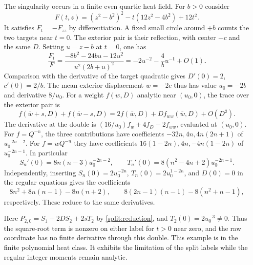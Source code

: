 The singularity occurs in a finite even quartic heat field.
For \(b>0\) consider
\begin{equation}
 F(t,z)=(z^2-b^2)^2-t(12z^2-4b^2)+12t^2 .
 \label{split:quartic}
\end{equation}
It satisfies \(F_t=-F_{zz}\) by differentiation. A fixed small
circle around \(+b\) counts the two targets near \(t=0\). The
exterior pair is their reflection, with center \(-c\) and the same
\(D\). Setting \(u=z-b\) at \(t=0\), one has
\[
 \frac{F_t}{F}
  =\frac{-8b^2-24bu-12u^2}{u^2(2b+u)^2}
  =-2u^{-2}-\frac4b u^{-1}+O(1).
\]
Comparison with the derivative of the target quadratic gives
\(D'(0)=2\), \(c'(0)=2/b\). The mean exterior displacement
\(\bar w=-2c\) thus has value \(u_0=-2b\) and derivative \(8/u_0\).
For a weight \(f(w,D)\) analytic near \((u_0,0)\), the trace over
the exterior pair is
\[
 f(\bar w+s,D)+f(\bar w-s,D)
    =2f(\bar w,D)+Df_{ww}(\bar w,D)+O(D^2).
\]
The derivative at the double is
\((16/u_0) f_w+4f_D+2f_{ww}\), evaluated at \((u_0,0)\).
For \(f=Q^{-n}\), the three contributions have coefficients
\(-32n,4n,4n(2n+1)\) of \(u_0^{-2n-2}\). For \(f=wQ^{-n}\)
they have coefficients \(16(1-2n),4n,-4n(1-2n)\) of
\(u_0^{-2n-1}\). In particular
\[
 S_n'(0)=8n(n-3)u_0^{-2n-2},\qquad
 T_n'(0)=8(n^2-4n+2)u_0^{-2n-1}.
\]
Independently, inserting \(S_n(0)=2u_0^{-2n}\),
\(T_n(0)=2u_0^{1-2n}\), and \(D(0)=0\) in the regular equations
gives the coefficients
\[
 8n^2+8n(n-1)-8n(n+2),
 \qquad
 8(2n-1)(n-1)-8(n^2+n-1),
\]
respectively. These reduce to the same derivatives.

Here \(P_{2,0}=S_1+2DS_2+2sT_2\) by \eqref{split:reduction},
and \(T_2(0)=2u_0^{-3}\ne0\). Thus the square-root term is
nonzero on either label for \(t>0\) near zero, and the raw
coordinate has no finite derivative through this double.
This example is in the finite polynomial heat class. It
exhibits the limitation of the split labels while the regular
integer moments remain analytic.
